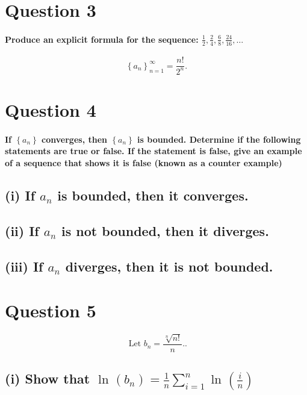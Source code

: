 \section*{Question 3}%
\label{sec:Question 3}

\paragraph{Produce an explicit formula for the sequence: $ \frac{1}{2},\frac{2}{4},\frac{6}{8},\frac{24}{16},\ldots $}

\[
\left\{ a_n \right\} _{ n=1 }^{ \infty }=\frac{ n! }{ 2^{ n } }
.\] 

\section*{Question 4}%
\paragraph{If $ \left\{ a_n \right\}  $ converges, then $ \left\{ a_n \right\}  $ is bounded. Determine if the following statements are true or false. If the statement is false, give an example of a sequence that shows it is false (known as a counter example)}


\subsection*{(i) If $ a_n $ is bounded, then it converges.}%
\subsection*{(ii) If $ a_n $ is not bounded, then it diverges.}%
\subsection*{(iii) If $ a_n $ diverges, then it is not bounded.}%

\section*{Question 5}%
\[
\text{ Let }b_n = \frac{ \sqrt[ n ]{ n! }  }{ n }. 
.\] 
\subsection*{(i) Show that $ \ln^{  } \left( b_n \right) =\frac{ 1 }{ n } \sum_{ i=1 } ^{ n } \ln^{  } \left( \frac{ i }{ n }  \right)$}%

